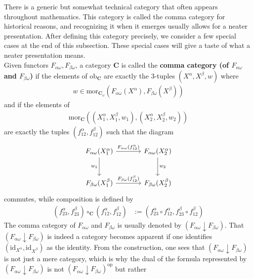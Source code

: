 There is a generic but somewhat technical category that often appears throughout mathematics.
This category is called the comma category for historical reasons, and recognizing it when it emerges usually allows for a neater presentation.
After defining this category precisely, we consider a few special cases at the end of this subsection.
These special cases will give a taste of what a neater presentation means.
\\
Given functors $F_{\alpha\omega},F_{\beta\omega}$, a category $\mathbf{C}$ is called the \textbf{comma category (of $F_{\alpha\omega}$ and $F_{\beta\omega}$)} if the elements of $\mathrm{ob}_{\mathbf{C}}$ are exactly the $3$-tuples $(X^{\alpha},X^{\beta},w)$ where
\begin{align*}
  w
  \in
  \mathrm{mor}_{\mathbf{C}_{\omega}}
  \left(
    F_{\alpha\omega}(X^{\alpha}),
    F_{\beta\omega}(X^{\beta})
  \right)
\end{align*}
and if the elements of
\begin{align*}
  \mathrm{mor}_{\mathbf{C}}
  \left(
    (X_{1}^{\alpha},X_{1}^{\beta},w_{1}),
    (X_{2}^{\alpha},X_{2}^{\beta},w_{2})
  \right)
\end{align*}
are exactly the tuples $(f_{12}^{\alpha},f_{12}^{\beta})$ such that the diagram 
\[
\begin{tikzcd}[sep=large]
  F_{\alpha\omega}(X_{1}^{\alpha})
  \arrow{r}{F_{\alpha\omega}(f_{12}^{\alpha})}
  \arrow[swap]{d}{w_{1}}
  &
  F_{\alpha\omega}(X_{2}^{\alpha})
  \arrow{d}{w_{2}}
  \\
  F_{\beta\omega}(X_{1}^{\beta})
  \arrow{r}{F_{\beta\omega}(f_{12}^{\beta})}
  &
  F_{\beta\omega}(X_{2}^{\beta})
\end{tikzcd}
\]
commutes, while composition is defined by
\begin{align*}
  (f_{23}^{\alpha},f_{23}^{\beta})
  \circ_{\mathbf{C}}
  (f_{12}^{\alpha},f_{12}^{\beta})
  &:=
  (f_{23}^{\alpha} \circ f_{12}^{\alpha},f_{23}^{\beta} \circ f_{12}^{\beta})
\end{align*}
The comma category of $F_{\alpha\omega}$ and $F_{\beta\omega}$ is usually denoted by $(F_{\alpha\omega} \downarrow F_{\beta\omega})$.
That $(F_{\alpha\omega} \downarrow F_{\beta\omega})$ is indeed a category becomes apparent if one identifies $(\mathrm{id}_{X^{\alpha}},\mathrm{id}_{X^{\beta}})$ as the identity.
From the construction, one sees that $(F_{\alpha\omega} \downarrow F_{\beta\omega})$ is not just a mere category, which is why the dual of the formula represented by $(F_{\alpha\omega} \downarrow F_{\beta\omega})$ is not $(F_{\alpha\omega} \downarrow F_{\beta\omega})^{\mathrm{op}}$ but rather
